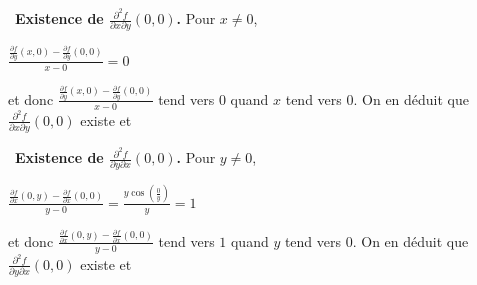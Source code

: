{\begin{enumerate}
{\begin{center}
\end{center}
\textbullet~\textbf{Existence de $\frac{\partial^2f}{\partial x\partial y}(0,0)$.} Pour $x\neq0$,

\begin{center}
$\frac{\frac{\partial f}{\partial y}(x,0)-\frac{\partial f}{\partial y}(0,0)}{x-0}=0$
\end{center}
et donc $\frac{\frac{\partial f}{\partial y}(x,0)-\frac{\partial f}{\partial y}(0,0)}{x-0}$ tend vers $0$ quand $x$ tend vers $0$. On en déduit que $\frac{\partial^2f}{\partial x\partial y}(0,0)$ existe et

\begin{center}
\end{center}
\textbullet~\textbf{Existence de $\frac{\partial^2f}{\partial y\partial x}(0,0)$.} Pour $y\neq0$,

\begin{center}
$\frac{\frac{\partial f}{\partial x}(0,y)-\frac{\partial f}{\partial x}(0,0)}{y-0}=\frac{y\cos\left(\frac{0}{y}\right)}{y}=1$
\end{center}
et donc $\frac{\frac{\partial f}{\partial x}(0,y)-\frac{\partial f}{\partial x}(0,0)}{y-0}$ tend vers $1$ quand $y$ tend vers $0$. On en déduit que $\frac{\partial^2f}{\partial y\partial x}(0,0)$ existe et

\begin{center}
\end{center}}
\end{enumerate}
}
